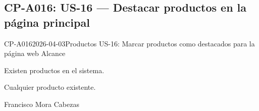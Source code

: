 \subsection{CP-A016: US-16 --- Destacar productos en la página principal}
\def\cpPasos{%
  \item Navegar a Productos.
  \item Localizar el botón para marcar producto como destacado.
  \item Activarlo y observar la respuesta del sistema.}
\def\cpResultadoE{%
  \item El producto se marca como destacado y se refleja en la página web.}
\def\cpResultadoO{\textcolor{rojo}{El botón para marcar producto como destacado
  existe en la interfaz, pero no funciona --- al presionarlo no se realiza ninguna
  acción visible ni se guarda el cambio.} (Ver HAL-007)}
\casoprueba
  {CP-A016}{2026-04-03}{Productos}
  {US-16: Marcar productos como destacados para la página web}
  {Alcance}{\estadoFallido}
  {\item Existen productos en el sistema.}
  {\item Cualquier producto existente.}
  {Francisco Mora Cabezas}
